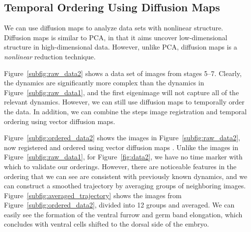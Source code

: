 \documentclass{pnastwo}
\begin{document}
\begin{article}
\subsection{Temporal Ordering Using Diffusion Maps}

We can use diffusion maps \cite{coifman2005geometric} to analyze data sets with nonlinear structure.
%
Diffusion maps is similar to PCA, in that it aims uncover low-dimensional structure in high-dimensional data.
%
However, unlike PCA, diffusion maps is a {\it nonlinear} reduction technique. 

Figure~\ref{subfig:raw_data2} shows a data set of images from stages 5--7.
%
Clearly, the dynamics are significantly more complex than the dynamics in Figure~\ref{subfig:raw_data1}, and the first eigenimage will not capture all of the relevant dynamics.
%
However, we can still use diffusion maps to temporally order the data.
%
In addition, we can combine the steps image registration and temporal ordering using vector diffusion maps. 

Figure~\ref{subfig:ordered_data2} shows the images in Figure~\ref{subfig:raw_data2}, now registered and ordered using vector diffusion maps \cite{singer2012vector}.
%
Unlike the images in Figure~\ref{subfig:raw_data1}, 
for Figure~\ref{fig:data2}, we have no time marker with which to validate our orderings.
%
However, there are noticeable features in the ordering that we can see are consistent with previously known dynamics,
and we can construct a smoothed trajectory by averaging groups of neighboring images.
%
Figure~\ref{subfig:averaged_trajectory} shows the images from Figure~\ref{subfig:ordered_data2}, divided into 12 groups and averaged. 
%
We can easily see the formation of the ventral furrow and germ band elongation, which concludes with ventral cells shifted to the dorsal side of the embryo.


\end{article}
\end{document}

